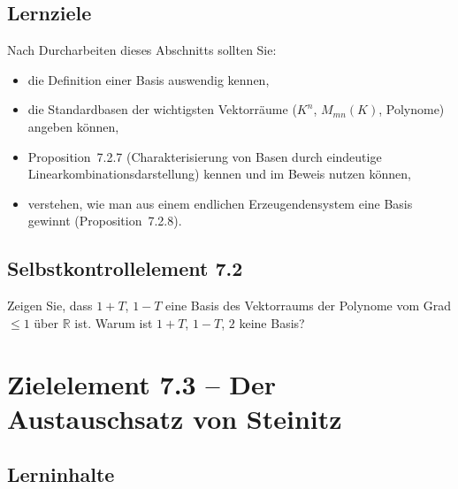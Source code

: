 \documentclass[a4paper,12pt]{article}
\begin{document}
\subsection*{Lernziele}

Nach Durcharbeiten dieses Abschnitts sollten Sie:
\begin{itemize}
  \item die Definition einer Basis auswendig kennen,
  \item die Standardbasen der wichtigsten Vektorräume ($K^n$, $M_{mn}(K)$,
        Polynome) angeben können,
  \item Proposition~7.2.7 (Charakterisierung von Basen durch eindeutige
        Linearkombinationsdarstellung) kennen und im Beweis nutzen können,
  \item verstehen, wie man aus einem endlichen Erzeugendensystem eine Basis
        gewinnt (Proposition~7.2.8).
\end{itemize}

\subsection*{Selbstkontrollelement 7.2}

Zeigen Sie, dass $1+T$, $1-T$ eine Basis des Vektorraums der Polynome vom
Grad $\le 1$ über $\mathbb{R}$ ist. Warum ist $1+T$, $1-T$, $2$ keine Basis?

\newpage

\section*{Zielelement 7.3 -- Der Austauschsatz von Steinitz}

\subsection*{Lerninhalte}

\begin{center}
\end{center}
\end{document}

